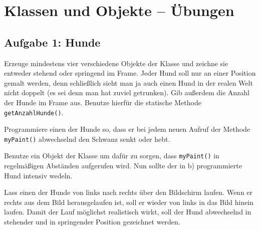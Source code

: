 \clearpage

\rehead[]{\textcolor{lightblue}{AvHG, Inf, My}}
\lohead[]{\textcolor{lightblue}{AvHG, Inf, My}}

\section{Klassen und Objekte -- Übungen}

\subsection{Aufgabe 1: Hunde}

\begin{compactenum}[a)]
\item Erzeuge mindestens vier verschiedene Objekte der Klasse  und
zeichne sie entweder stehend oder springend im Frame. Jeder Hund soll nur an
einer Position gemalt werden, denn schließlich sieht man ja auch einen Hund in
der realen Welt nicht doppelt (es sei denn man hat zuviel getrunken). Gib
außerdem die Anzahl der Hunde im Frame aus. Benutze hierfür die statische
Methode \lstinline|getAnzahlHunde()|.

\item Programmiere einen der Hunde so, dass er bei jedem neuen Aufruf der
Methode \lstinline|myPaint()| abwechselnd den Schwanz senkt oder hebt.

\item Benutze ein Objekt der Klasse  um dafür zu sorgen, dass
\lstinline|myPaint()| in regelmäßigen Abständen aufgerufen wird. Nun sollte der
in b) programmierte Hund intensiv wedeln.

\item Lass einen der Hunde von links nach rechts über den Bildschirm laufen.
Wenn er rechts aus dem Bild herausgelaufen ist, soll er wieder von links in das
Bild hinein laufen. Damit der Lauf möglichst realistisch wirkt, soll der Hund
abwechselnd in stehender und in springender Position gezeichnet werden.
\end{compactenum}


